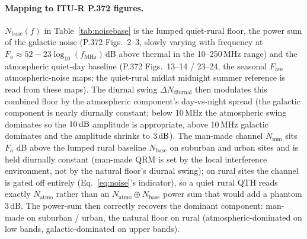 \documentclass[11pt,a4paper]{article}
\newcommand{\SI}[2]{#1\,\text{#2}}
\newcommand{\dB}{\text{dB}}
\begin{document}
\paragraph{Mapping to ITU-R P.372 figures.}  $N_{\text{base}}(f)$ in
Table~\ref{tab:noisebase} is the lumped quiet-rural floor, the power
sum of the galactic noise (P.372 Figs.~2--3, slowly varying with
frequency at $F_a \approx 52 - 23\log_{10}(f_{\text{MHz}})$\,dB
above thermal in the 10--250\,MHz range) and the atmospheric
quiet-day baseline (P.372 Figs.~13--14 / 23--24, the seasonal
$F_{am}$ atmospheric-noise maps; the quiet-rural midlat midnight
summer reference is read from these maps). The diurnal swing $\Delta N_{\text{diurnal}}$ then
modulates this combined floor by the atmospheric component's
day-vs-night spread (the galactic component is nearly diurnally
constant; below 10\,MHz the atmospheric swing dominates so the
$\SI{10}{\dB}$ amplitude is appropriate, above 10\,MHz galactic
dominates and the amplitude shrinks to $\SI{3}{\dB}$). The man-made
channel $N_{\text{mm}}$ sits $F_a$ dB above the lumped rural
baseline $N_{\text{base}}$ on suburban and urban sites and is held
diurnally constant (man-made QRM is set by the local interference
environment, not by the natural floor's diurnal swing); on rural
sites the channel is gated off entirely
(Eq.~\ref{eq:noise}'s indicator), so a quiet rural QTH reads
exactly $N_{\text{atmo}}$ rather than an
$N_{\text{atmo}}\oplus N_{\text{base}}$ power sum that would add
a phantom 3\,dB. The power-sum then correctly recovers the dominant
component: man-made on suburban / urban, the natural floor on
rural (atmospheric-dominated on low bands, galactic-dominated on
upper bands).
\end{document}

